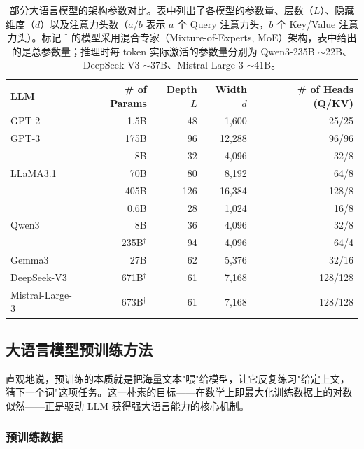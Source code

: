 \begin{table}[t]
\centering
\begingroup
\renewcommand{\arraystretch}{1.2}
\begin{tabular}{l | r | r | r | r}
LLM & \# of Params & Depth $L$ & Width $d$ & \# of Heads (Q/KV) \\ \hline
GPT-2 \cite{radford-etal:2019language} & 1.5B & 48 & 1,600 & 25/25 \\
GPT-3 \cite{brown-etal:2020language} & 175B & 96 & 12,288 & 96/96 \\ \hline
\multirow{3}{*}{LLaMA3.1 \cite{dubey2024llama}}
 & 8B & 32 & 4,096 & 32/8 \\
 & 70B & 80 & 8,192 & 64/8 \\
 & 405B & 126 & 16,384 & 128/8 \\ \hline
\multirow{3}{*}{Qwen3 \cite{yang2025qwen3}}
 & 0.6B & 28 & 1,024 & 16/8 \\
 & 8B & 36 & 4,096 & 32/8 \\
 & 235B$^\dagger$ & 94 & 4,096 & 64/4 \\ \hline
Gemma3 \cite{gemmateam2025gemma3} & 27B & 62 & 5,376 & 32/16 \\ \hline
DeepSeek-V3 \cite{liu2024deepseek} & 671B$^\dagger$ & 61 & 7,168 & 128/128 \\
Mistral-Large-3 \cite{mistral2025mistral3} & 673B$^\dagger$ & 61 & 7,168 & 128/128
\end{tabular}
\endgroup
\caption{部分大语言模型的架构参数对比。表中列出了各模型的参数量、层数（$L$）、隐藏维度（$d$）以及注意力头数（$a/b$ 表示 $a$ 个 Query 注意力头，$b$ 个 Key/Value 注意力头）。标记 $^\dagger$ 的模型采用混合专家（Mixture-of-Experts, MoE）架构，表中给出的是总参数量；推理时每 token 实际激活的参数量分别为 Qwen3-235B $\sim$22B、DeepSeek-V3 $\sim$37B、Mistral-Large-3 $\sim$41B。}
\label{tab:llm-model-size-comparison}
\end{table}

\subsection{大语言模型预训练方法}

直观地说，预训练的本质就是把海量文本"喂"给模型，让它反复练习"给定上文，猜下一个词"这项任务。这一朴素的目标——在数学上即最大化训练数据上的对数似然——正是驱动 LLM 获得强大语言能力的核心机制。

\subsubsection{预训练数据}

